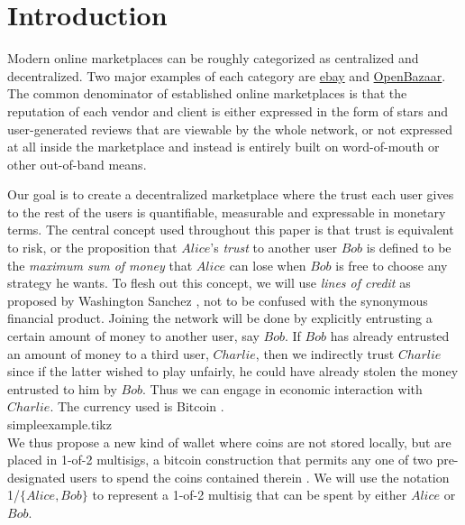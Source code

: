 \section{Introduction}
  Modern online marketplaces can be roughly categorized as centralized and decentralized.
  Two major examples of each category are \href{http://www.ebay.com}{ebay} and \href{https://openbazaar.org/}{OpenBazaar}.
  The common denominator of established online marketplaces is that the reputation of each vendor and client is either
  expressed in the form of stars and user-generated reviews that are viewable by the whole network, or not expressed at
  all inside the marketplace and instead is entirely built on word-of-mouth or other out-of-band means.

  Our goal is to create a decentralized marketplace where the trust each user gives to the rest of the users is
  quantifiable, measurable and expressable in monetary terms. The central concept used throughout this paper is
  that trust is equivalent to risk, or the proposition that $Alice$'s \textit{trust} to another user $Bob$ is defined to
  be the \textit{maximum sum of money} that $Alice$ can lose when $Bob$ is free to choose any strategy he wants. To flesh
  out this concept, we will use \textit{lines of credit} as proposed by Washington Sanchez \cite{loc}, not to be confused
  with the synonymous financial product. Joining the network
  will be done by explicitly entrusting a certain amount of money to another user, say $Bob$. If $Bob$ has already
  entrusted an amount of money to a third user, $Charlie$, then we indirectly trust $Charlie$ since if the latter wished
  to play unfairly, he could have already stolen the money entrusted to him by $Bob$. Thus we can engage in economic
  interaction with $Charlie$. The currency used is Bitcoin \cite{bitcoin}. \medskip \ \\
  {simpleexample.tikz} \smallskip \ \\
  We thus propose a new kind of wallet where coins are not stored locally, but are placed in 1-of-2 multisigs, a bitcoin
  construction that permits any one of two pre-designated users to spend the coins contained therein
  \cite{masteringbitcoin}. We will use the notation 1/$\{Alice, Bob\}$ to represent a 1-of-2 multisig that can be spent by
  either $Alice$ or $Bob$.

